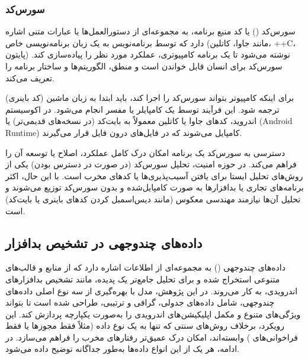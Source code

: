 \subsubsection{سورس‌کد}
سورس‌کد () یا کد منبع برنامه، به مجموعه‌ای از دستورالعمل‌ها یا عبارات متنی اشاره دارد که توسط برنامه‌نویس به یک زبان برنامه‌نویسی خاص (مانند جاوا، کاتلین، ++C، پایتون) نوشته می‌شود تا یک برنامه کامپیوتری، عملکرد مورد نظر را پیاده‌سازی کند. سورس‌کد برای انسان قابل خواندن است و منطق، الگوریتم‌ها و ساختار برنامه را تعریف می‌کند.

برای اینکه کامپیوتر بتواند سورس‌کد را اجرا کند، باید ابتدا به زبان ماشین (کد باینری) ترجمه شود. این فرآیند توسط یک کامپایلر یا مفسر انجام می‌شود. در اکوسیستم اندروید، کدهای جاوا یا کاتلین معمولاً به بایت‌کد  (در نسخه‌های قدیمی‌تر) یا  (Android Runtime) کامپایل می‌شوند که در فایل‌های  درون فایل  قرار می‌گیرند.

دسترسی به سورس‌کد یک برنامه امکان درک کامل عملکرد، اصلاح یا توسعه آن را فراهم می‌کند. در حوزه امنیت، تحلیل سورس‌کد (در صورت در دسترس بودن) یکی از روش‌های تحلیل ایستا برای یافتن آسیب‌پذیری‌ها یا کدهای مخرب است. با این حال، اکثر برنامه‌های تجاری یا بدافزارها به صورت کامپایل‌شده و بدون سورس‌کد توزیع می‌شوند و تحلیل آن‌ها نیازمند مهندسی معکوس (مانند دیس‌اسمبل کردن کدهای باینری یا بایت‌کد) است.

\subsection{داده‌های چندوجهی در تشخیص بدافزار}
داده‌های چندوجهی () به مجموعه‌ای از اطلاعات اشاره دارد که از منابع و قالب‌های متنوعی استخراج شده و برای تحلیل جامع‌تر یک پدیده، مانند تشخیص بدافزارهای اندرویدی، به کار می‌روند. در این پژوهش، مدل  با بهره‌گیری از سه نوع اصلی داده‌های چندوجهی، شامل داده‌های جدولی، گرافی و ترتیبی، طراحی شده است تا بتواند ویژگی‌های متنوع و مکمل اپلیکیشن‌های اندرویدی را به‌صورت یکپارچه پردازش کند. این رویکرد، برخلاف روش‌های سنتی که تنها به یک نوع داده (مثلاً فقط مجوزها یا فقط فراخوانی‌های ) وابسته‌اند، امکان درک عمیق‌تر رفتارهای مخرب را فراهم می‌سازد. در ادامه، هر یک از این انواع داده‌ها به‌طور جداگانه توضیح داده می‌شود.

